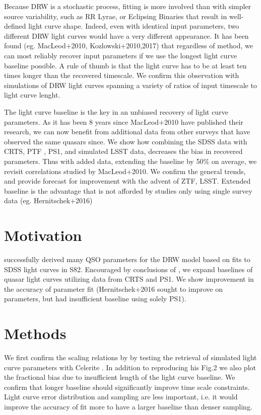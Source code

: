 \documentclass[fleqn,usenatbib]{mnras}  %
\begin{document}
Because DRW is a stochastic process, fitting is more involved than with simpler source variability, such as RR Lyrae, or Eclipsing Binaries that result in well-defined light curve shape.  Indeed,  even with identical input parameters,  two different DRW light curves would have a very different appearance. It has been found (eg. MacLeod+2010,  Kozlowski+2010,2017) that regardless of method,  we can most reliably recover input parameters if we use the longest light curve baseline possible. A rule of thumb is that the light curve has to be at least  ten  times longer than the recovered timescale.  We confirm this observation with simulations of DRW light curves spanning a variety of ratios of input timescale to light curve lenght.  

The light curve baseline is the key in an unbiased recovery of light curve parameters. As it has been  8 years since MacLeod+2010 have published their research,   we can now benefit from additional data from other surveys that have observed the same quasars since. We show how combining the SDSS data with CRTS, PTF , PS1,  and simulated LSST data, decreases the bias in recovered parameters.  Thus with added data, extending the baseline by 50\% on average,  we revisit correlations studied by MacLeod+2010.  We confirm the general trends, and provide forecast for improvement with the advent of ZTF, LSST. Extended baseline is the advantage that is not afforded by studies only using single survey data (eg. Hernitschek+2016)



\section{}


\section{Motivation}
\cite{macleod2011} successfully  derived  many QSO parameters for the DRW model based on fits to SDSS light curves in S82. Encouraged by conclusions of \cite{kozlowski2017a},  we expand baselines of quasar light curves  utilizing data from CRTS and PS1. We show improvement in the accuracy of parameter fit (Hernitschek+2016 sought to improve on parameters, but had insufficient baseline using solely PS1). 

\section{Methods}
 We first confirm the scaling relations by \cite{kozlowski2017a} by testing the retrieval of simulated light curve parameters with Celerite . In addition to reproducing his Fig.2  we also plot the fractional bias due to insufficient length of the  light curve baseline. We confirm that longer  baseline should significantly improve time scale constraints. Light curve error distribution and sampling are less important, i.e. it would improve the accuracy of fit more to have a larger baseline than denser sampling. 
\end{document}
